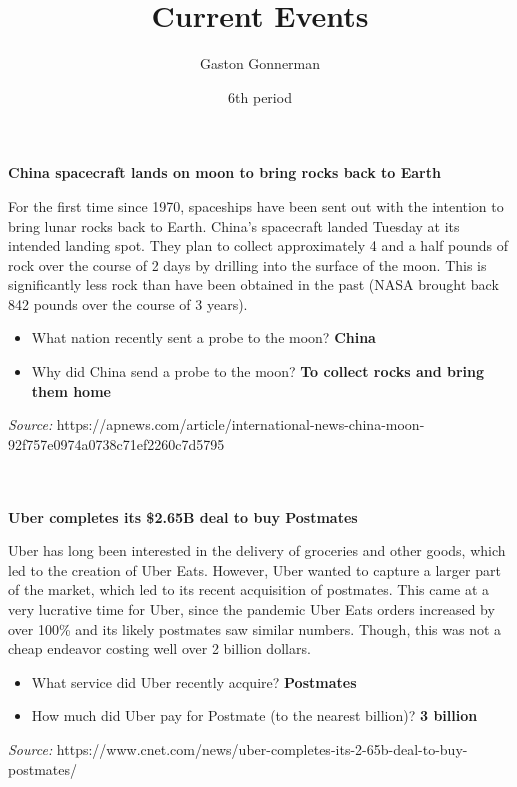\documentclass{article}
\title{Current Events}
\author{Gaston Gonnerman}
\date{6th period}
\begin{document}
	\maketitle
	
	\begin{center}
		\large{
			\textbf{China spacecraft lands on moon to bring rocks back to Earth}
		}
	\end{center}
	\par For the first time since 1970, spaceships have been sent out with the intention to bring lunar rocks back to Earth. China's spacecraft landed Tuesday at its intended landing spot. They plan to collect approximately 4 and a half pounds of rock over the course of 2 days by drilling into the surface of the moon. This is significantly less rock than have been obtained in the past (NASA brought back 842 pounds over the course of 3 years).
	
	\begin{itemize}[label=--]
		\item What nation recently sent a probe to the moon? \textbf{China}
		\item Why did China send a probe to the moon? \textbf{To collect rocks and bring them home}
	\end{itemize}

	\noindent
	\emph{Source:} https://apnews.com/article/international-news-china-moon-92f757e0974a0738c71ef2260c7d5795
	\\ \\ \\
	
	\begin{center}
		\large{
			\textbf{Uber completes its \$2.65B deal to buy Postmates}
		}
	\end{center}
	\par Uber has long been interested in the delivery of groceries and other goods, which led to the creation of Uber Eats. However, Uber wanted to capture a larger part of the market, which led to its recent acquisition of postmates. This came at a very lucrative time for Uber, since the pandemic Uber Eats orders increased by over 100\% and its likely postmates saw similar numbers. Though, this was not a cheap endeavor costing well over 2 billion dollars.
	
	\begin{itemize}[label=--]
		\item What service did Uber recently acquire? \textbf{Postmates}
		\item How much did Uber pay for Postmate (to the nearest billion)? \textbf{3 billion}
	\end{itemize}

	\noindent
	\emph{Source:} https://www.cnet.com/news/uber-completes-its-2-65b-deal-to-buy-postmates/
\end{document}

